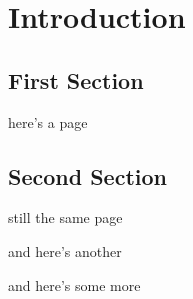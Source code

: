 \chapter{Introduction}
\section{First Section}

here's a page

\section{Second Section}

still the same page

\newpage

and here's another

\newpage

and here's some more

